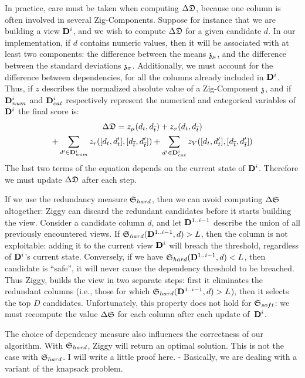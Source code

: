 In practice, care must be taken when computing $\Delta\mathfrak{D}$, because one
column is often involved in several Zig-Components. Suppose for instance that we
are building a view $\mathbf{D}^{i}$, and we wish to compute $\Delta\mathfrak{D}$ for
a given candidate $d$.  In our
implementation, if $d$ contains numeric values, then it will be associated with
at least two components: the difference between the means $\mathfrak{z}_\mu$, and the
difference between the standard deviations $\mathfrak{z}_\sigma$.  Additionally, we must
account for the difference between dependencies, for all the columns
already included in $\mathbf{D}^{i}$. Thus, if $z$ describes the normalized absolute
value of a Zig-Component $\mathfrak{z}$, and if $\mathbf{D}^{i}_{num}$ and
$\mathbf{D}^{i}_{cat}$ respectively represent the numerical and categorical
variables of $\mathbf{D}^{i}$ the final score is:
    \begin{multline}
\Delta\mathfrak{D} = 
z_\mu(d_t, d_{\overline{t}}) +
z_\sigma(d_t, d_{\overline{t}}) \\
+ \sum_{d' \in \mathbf{D}^i_{num}} z_r([d_t, d_t'], [d_{\overline{t}}, d_{\overline{t}}'])
+ \sum_{d' \in \mathbf{D}^i_{cat}} z_V([d_t, d_t'], [d_{\overline{t}}, d_{\overline{t}}'])
\end{multline}
The last two terms of the equation depends on the current state of $ \mathbf{D}^i$.
Therefore we must update $\Delta\mathfrak{D}$ after each step.

If we use the redundancy measure $\mathfrak{S}_{hard}$, then we can avoid computing $
\Delta\mathfrak{S}$ altogether: Ziggy can discard the redundant candidates before
it starts building the view.  Consider a candidate column $d$,
and let $\mathbf{D}^{1..i-1}$ describe the union of all previously encountered
views. If $\mathfrak{S}_{hard} (\mathbf{D}^{1..i-1}, d) > L$, then the column is not
exploitable: adding it to the current view $\mathbf{D}^{i}$ will breach the
threshold, regardless of $\mathbf{D}^{i}$'s current state.  Conversely, if we have
$\mathfrak{S}_{hard}(\mathbf{D}^{1..i-1}, d) < L$, then candidate is ``safe'', it will
never cause the dependency threshold to be breached.  Thus Ziggy, builds the
view in two separate steps: first it eliminates the redundant columns (i.e.,
those for which $\mathfrak{S}_{hard} (\mathbf{D}^{1..i-1}, d) > L$), then it selects the
top $D$ candidates.  Unfortunately, this property does not hold for
$\mathfrak{S}_{soft}$: we must recompute the value $\Delta\mathfrak{S}$ for each column
after each update of~$\mathbf{D}^{i}$.

The choice of dependency measure also influences the correctness of our
algorithm. With $\mathfrak{S}_{hard}$, Ziggy will return an optimal solution. This is
not the case with $\mathfrak{S}_{hard}$.
{\color{red} I will write a little proof here. - Basically, we are dealing with
a variant of the knapsack problem.}

